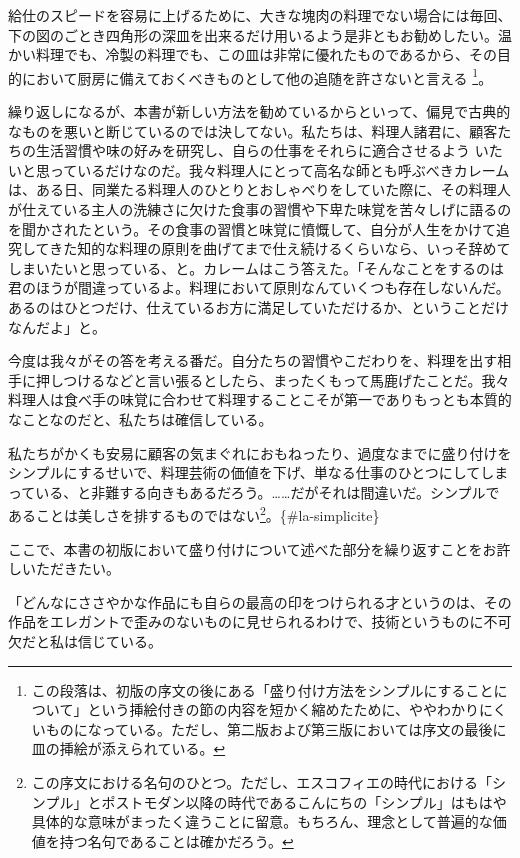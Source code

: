 給仕のスピードを容易に上げるために、大きな塊肉の料理でない場合には毎回、下の図のごとき四角形の深皿を出来るだけ用いるよう是非ともお勧めしたい。温かい料理でも、冷製の料理でも、この皿は非常に優れたものであるから、その目的において厨房に備えておくべきものとして他の追随を許さないと言える
\footnote{この段落は、初版の序文の後にある「盛り付け方法をシンプルにすることについて」という挿絵付きの節の内容を短かく縮めたために、ややわかりにくいものになっている。ただし、第二版および第三版においては序文の最後に皿の挿絵が添えられている。}。

繰り返しになるが、本書が新しい方法を勧めているからといって、偏見で古典的なものを悪いと断じているのでは決してない。私たちは、料理人諸君に、顧客たちの生活習慣や味の好みを研究し、自らの仕事をそれらに適合させるよう
いたいと思っているだけなのだ。我々料理人にとって高名な師とも呼ぶべきカレームは、ある日、同業たる料理人のひとりとおしゃべりをしていた際に、その料理人が仕えている主人の洗練さに欠けた食事の習慣や下卑た味覚を苦々しげに語るのを聞かされたという。その食事の習慣と味覚に憤慨して、自分が人生をかけて追究してきた知的な料理の原則を曲げてまで仕え続けるくらいなら、いっそ辞めてしまいたいと思っている、と。カレームはこう答えた。「そんなことをするのは君のほうが間違っているよ。料理において原則なんていくつも存在しないんだ。あるのはひとつだけ、仕えているお方に満足していただけるか、ということだけなんだよ」と。

今度は我々がその答を考える番だ。自分たちの習慣やこだわりを、料理を出す相手に押しつけるなどと言い張るとしたら、まったくもって馬鹿げたことだ。我々料理人は食べ手の味覚に合わせて料理することこそが第一でありもっとも本質的なことなのだと、私たちは確信している。

私たちがかくも安易に顧客の気まぐれにおもねったり、過度なまでに盛り付けをシンプルにするせいで、料理芸術の価値を下げ、単なる仕事のひとつにしてしまっている、と非難する向きもあるだろう。\ldots{}\ldots{}だがそれは間違いだ。シンプルであることは美しさを排するものではない\footnote{この序文における名句のひとつ。ただし、エスコフィエの時代における「シンプル」とポストモダン以降の時代であるこんにちの「シンプル」はもはや具体的な意味がまったく違うことに留意。もちろん、理念として普遍的な価値を持つ名句であることは確かだろう。}。\{\#la-simplicite\}

ここで、本書の初版において盛り付けについて述べた部分を繰り返すことをお許しいただきたい。

「どんなにささやかな作品にも自らの最高の印をつけられる才というのは、その作品をエレガントで歪みのないものに見せられるわけで、技術というものに不可欠だと私は信じている。

